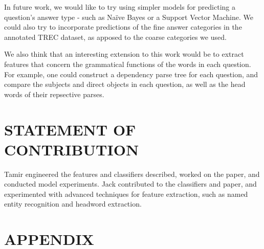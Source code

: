 \documentclass[letterpaper, 10 pt, conference]{ieeeconf}  %
\begin{document}
In future work, we would like to try using simpler models for predicting a question's answer type - such as Naïve Bayes or a Support Vector Machine. We could also try to incorporate predictions of the fine answer categories in the annotated TREC dataset, as apposed to the coarse categories we used. 

We also think that an interesting extension to this work would be to extract features that concern the grammatical functions of the words in each question. For example, one could construct a dependency parse tree for each question, and compare the subjects and  direct objects in each question, as well as the head words of their repsective parses.

\addtolength{\textheight}{-12cm}   %









\section{STATEMENT OF CONTRIBUTION}

Tamir engineered the features and classifiers described, worked on the paper, and conducted model experiments. Jack contributed to the classifiers and paper, and experimented with advanced techniques for feature extraction, such as named entity recognition and headword extraction. 

\section{APPENDIX}
\end{document}
